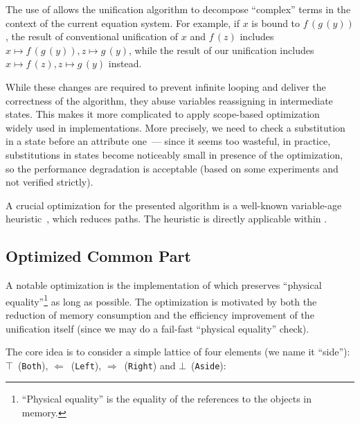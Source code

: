 The use of \commonpart allows the unification algorithm to decompose ``complex'' terms in the context of the current equation system.
For example, if $x$ is bound to $f\,(g\,(y))$, the result of conventional unification of $x$ and $f\,(z)$ includes $x \mapsto f\,(g\,(y)), z \mapsto g\,(y)$, while the result of our unification includes $x \mapsto f\,(z), z \mapsto g\,(y)$ instead.

While these changes are required to prevent infinite looping and deliver the correctness of the algorithm, they abuse variables reassigning in intermediate states.
This makes it more complicated to apply scope-based optimization~\cite{byrd2009relational} widely used in \miniKanren implementations. More precisely, we need to check a substitution in a state before an attribute one~--- since it seems too wasteful, in practice, substitutions in states become noticeably small in presence of the optimization, so the performance degradation is acceptable (based on some experiments and not verified strictly).

A crucial optimization for the presented algorithm is a well-known variable-age heuristic~\cite{mannila1986complexity,domoratskiy2025empirical}, which reduces \walk paths. The heuristic is directly applicable within \union.

\subsection{Optimized Common Part}

A notable optimization is the implementation of \commonpart which preserves ``physical equality''\footnote{``Physical equality'' is the equality of the references to the objects in memory.} as long as possible. The optimization is motivated by both the reduction of memory consumption and the efficiency improvement of the unification itself (since we may do a fail-fast ``physical equality'' check).

The core idea is to consider a simple lattice of four elements (we name it ``side''): $\top$~(\texttt{Both}), $\Leftarrow$~(\texttt{Left}), $\Rightarrow$~(\texttt{Right}) and $\bot$~(\texttt{Aside}):
\begin{center}
\end{center}

